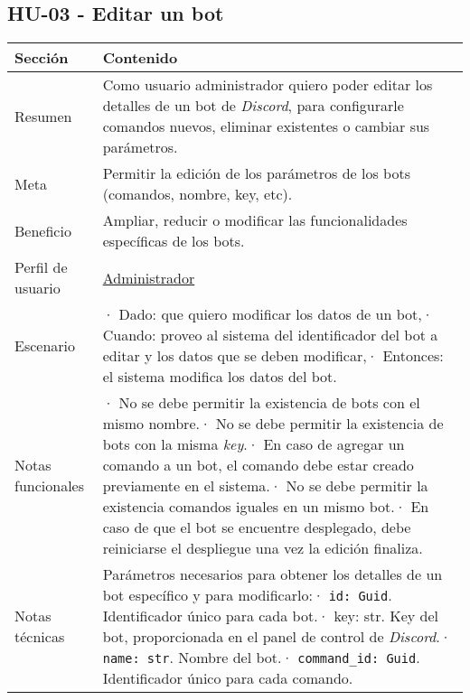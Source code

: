 \subsection{HU-03 - Editar un bot}
\label{sec:hu03}

\begin{table}[H]
    \centering
    \def\arraystretch{1.25}
    \begin{adjustbox}{max width=\textwidth}
    \begin{tabularx}{\textwidth}{|l|L|}
    \hline
        \textbf{Sección} & \textbf{Contenido} \\ \hline
    \hline
        Resumen & Como usuario administrador quiero poder editar los detalles de un bot de \textit{Discord}, para configurarle comandos nuevos, eliminar existentes o cambiar sus parámetros. \\ \hline
        Meta & Permitir la edición de los parámetros de los bots (comandos, nombre, key, etc). \\ \hline
        Beneficio & Ampliar, reducir o modificar las funcionalidades específicas de los bots. \\ \hline
        Perfil de usuario & \hyperref[sec:personaAdmin]{Administrador} \\ \hline
        Escenario & · Dado: que quiero modificar los datos de un bot,\linebreak · Cuando: proveo al sistema del identificador del bot a editar y los datos que se deben modificar,\linebreak · Entonces: el sistema modifica los datos del bot. \\ \hline
        Notas funcionales & · No se debe permitir la existencia de bots con el mismo nombre.\linebreak · No se debe permitir la existencia de bots con la misma \textit{key}.\linebreak · En caso de agregar un comando a un bot, el comando debe estar creado previamente en el sistema.\linebreak · No se debe permitir la existencia comandos iguales en un mismo bot.\linebreak · En caso de que el bot se encuentre desplegado, debe reiniciarse el despliegue una vez la edición finaliza. \\ \hline
        Notas técnicas & Parámetros necesarios para obtener los detalles de un bot específico y para modificarlo:\linebreak · \verb|id: Guid|. Identificador único para cada bot.\linebreak · key: str. Key del bot, proporcionada en el panel de control de \textit{Discord}.\linebreak · \verb|name: str|. Nombre del bot.\linebreak · \verb|command_id: Guid|. Identificador único para cada comando. \\ \hline

\end{tabularx}
\end{adjustbox}
\end{table}

